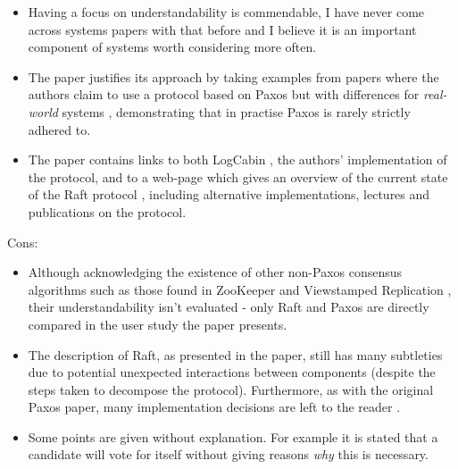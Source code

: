 \documentclass[11pt]{article}
\begin{document}
\begin{itemize}

    \item Having a focus on understandability is commendable, I have never come
    across systems papers with that before and I believe it is an important
    component of systems worth considering more often.

    \item The paper justifies its approach by taking examples from papers where
    the authors claim to use a protocol based on Paxos but with differences for
    \textit{real-world} systems \cite{Chubby}, demonstrating that in practise
    Paxos is rarely strictly adhered to.


    \item The paper contains links to both LogCabin \cite{LogCabin}, the
    authors' implementation of the protocol, and to a web-page which gives an
    overview of the current state of the Raft protocol \cite{RaftIO}, including
    alternative implementations, lectures and publications on the protocol.

\end{itemize}

Cons:

\begin{itemize}

    \item Although acknowledging the existence of other non-Paxos consensus
    algorithms such as those found in ZooKeeper \cite{ZooKeeper} and
    Viewstamped Replication \cite{ViewstampedReplication}, their
    understandability isn't evaluated - only Raft and Paxos are directly
    compared in the user study the paper presents.

    \item The description of Raft, as presented in the paper, still has many
    subtleties due to potential unexpected interactions between components
    (despite the steps taken to decompose the protocol). Furthermore, as with
    the original Paxos paper, many implementation decisions are left to the
    reader \cite{RaftRefloated}.

    \item Some points are given without explanation. For example it is stated
    that a candidate will vote for itself without giving reasons \textit{why}
    this is necessary.

\end{itemize}
\end{document}
